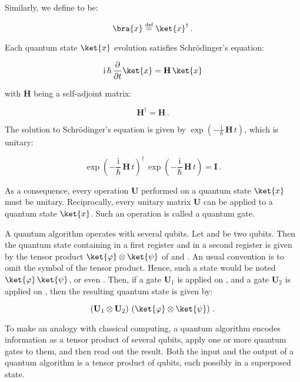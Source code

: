 \documentclass[11pt, a4paper]{article}
\begin{document}
                Similarly, we define  to be:
                
                \[\bra{x}\overset{\text{\tiny{def}}}{=}\ket{x}^\dagger\,.\]
                
                Each quantum state \(\ket{x}\) evolution satisfies Schrödinger's equation:
                
                \[\mathrm{i}\,\hbar\,\frac{\partial}{\partial t}\ket{x} = \mathbf{H}\,\ket{x}\]
                
                with \(\mathbf{H}\) being a self-adjoint matrix:
                
                \[\mathbf{H}^\dagger=\mathbf{H}\,.\]
                
                The solution to Schrödinger's equation is given by \(\exp\left(-\frac{\mathrm{i}}{\hbar}\,\mathbf{H}\,t\right)\), which is unitary:
                
                \[\exp\left(-\frac{\mathrm{i}}{\hbar}\,\mathbf{H}\,t\right)^\dagger\,\exp\left(-\frac{\mathrm{i}}{\hbar}\,\mathbf{H}\,t\right) = \mathbf{I}\,.\]
                
                As a consequence, every operation \(\mathbf{U}\) performed on a quantum state \(\ket{x}\) must be unitary. Reciprocally, every unitary matrix \(\mathbf{U}\) can be applied to a quantum state \(\ket{x}\). Such an operation is called a quantum gate. 
                
                A quantum algorithm operates with several qubits. Let \ket{\varphi} and \ket{\psi} be two qubits. Then the quantum state containing \ket{\varphi} in a first register and \ket{\psi} in a second register is given by the tensor product \(\ket{\varphi}\otimes\ket{\psi}\) of \ket{\varphi} and . An usual convention is to omit the symbol of the tensor product. Hence, such a state would be noted \(\ket{\varphi}\,\ket{\psi}\), or even \ket{\phi\psi}. Then, if a gate \(\mathbf{U}_1\) is applied on \ket{\varphi}, and a gate \(\mathbf{U}_2\) is applied on \ket{\psi}, then the resulting quantum state is given by:
                
                \[\left(\mathbf{U}_1\otimes\mathbf{U}_2\right)\,\left(\ket{\varphi}\otimes\ket{\psi}\right)\,.\]
                
                To make an analogy with classical computing, a quantum algorithm encodes information as a tensor product of several qubits, apply one or more quantum gates to them, and then read out the result. Both the input and the output of a quantum algorithm is a tensor product of qubits, each possibly in a superposed state.
                
\end{document}
